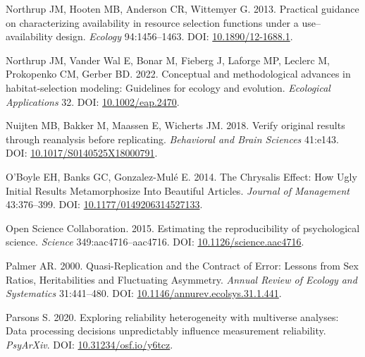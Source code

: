 \documentclass[10pt,a4paper]{article}
\newlength{\cslhangindent}
\newlength{\cslentryspacingunit} %
\newenvironment{CSLReferences}[2] %
 {%
  \setlength{\parindent}{0pt}
  \ifodd #1
  \let\oldpar\par
  \def\par{\hangindent=\cslhangindent\oldpar}
  \fi
  \setlength{\parskip}{#2\cslentryspacingunit}
 }%
 {}
\begin{document}
\begin{CSLReferences}{1}{0}
\leavevmode{}%
Northrup JM, Hooten MB, Anderson CR, Wittemyer G. 2013. Practical guidance on characterizing availability in resource selection functions under a use--availability design. \emph{Ecology} 94:1456--1463. DOI: \href{https://doi.org/10.1890/12-1688.1}{10.1890/12-1688.1}.

\leavevmode{}%
Northrup JM, Vander Wal E, Bonar M, Fieberg J, Laforge MP, Leclerc M, Prokopenko CM, Gerber BD. 2022. Conceptual and methodological advances in habitat‐selection modeling: Guidelines for ecology and evolution. \emph{Ecological Applications} 32. DOI: \href{https://doi.org/10.1002/eap.2470}{10.1002/eap.2470}.

\leavevmode{}%
Nuijten MB, Bakker M, Maassen E, Wicherts JM. 2018. Verify original results through reanalysis before replicating. \emph{Behavioral and Brain Sciences} 41:e143. DOI: \href{https://doi.org/10.1017/S0140525X18000791}{10.1017/S0140525X18000791}.

\leavevmode{}%
O'Boyle EH, Banks GC, Gonzalez-Mulé E. 2014. The {Chrysalis} {Effect}: {How} {Ugly} {Initial} {Results} {Metamorphosize} {Into} {Beautiful} {Articles}. \emph{Journal of Management} 43:376--399. DOI: \href{https://doi.org/10.1177/0149206314527133}{10.1177/0149206314527133}.

\leavevmode{}%
Open Science Collaboration. 2015. Estimating the reproducibility of psychological science. \emph{Science} 349:aac4716--aac4716. DOI: \href{https://doi.org/10.1126/science.aac4716}{10.1126/science.aac4716}.

\leavevmode{}%
Palmer AR. 2000. Quasi-{Replication} and the {Contract} of {Error}: {Lessons} from {Sex} {Ratios}, {Heritabilities} and {Fluctuating} {Asymmetry}. \emph{Annual Review of Ecology and Systematics} 31:441--480. DOI: \href{https://doi.org/10.1146/annurev.ecolsys.31.1.441}{10.1146/annurev.ecolsys.31.1.441}.

\leavevmode{}%
Parsons S. 2020. Exploring reliability heterogeneity with multiverse analyses: {Data} processing decisions unpredictably influence measurement reliability. \emph{PsyArXiv}. DOI: \href{https://doi.org/10.31234/osf.io/y6tcz}{10.31234/osf.io/y6tcz}.


\end{CSLReferences}
\end{document}
